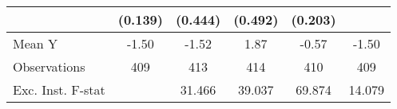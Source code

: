 {\begin{tabular}{l*{5}{c}}
            &     (0.139)         &     (0.444)         &     (0.492)         &     (0.203)         &                     \\
\midrule
Mean Y      &       -1.50         &       -1.52         &        1.87         &       -0.57         &       -1.50         \\
Observations&         409         &         413         &         414         &         410         &         409         \\
Exc. Inst. F-stat&                     &      31.466         &      39.037         &      69.874         &      14.079         \\
\bottomrule
\end{tabular}
}
